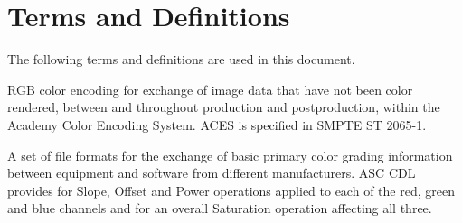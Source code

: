 \numberedformat
\chapter{Terms and Definitions}
The following terms and definitions are used in this document.

RGB color encoding for exchange of image data that have not been color rendered, between and throughout production and postproduction, within the Academy Color Encoding System. ACES is specified in SMPTE ST 2065-1.

A set of file formats for the exchange of basic primary color grading information between equipment and software from different manufacturers. ASC CDL provides for Slope, Offset and Power operations applied to each of the red, green and blue channels and for an overall Saturation operation affecting all three.
